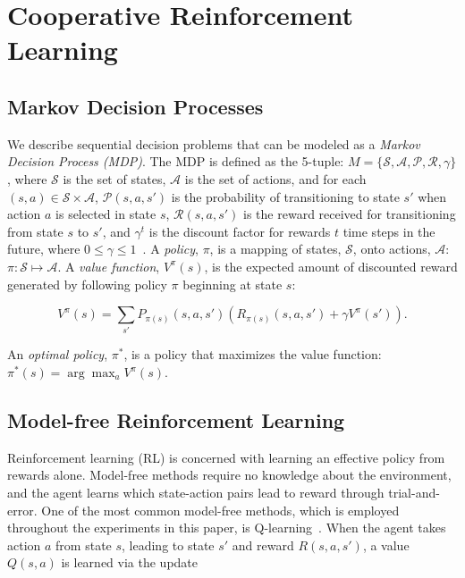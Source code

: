 \documentclass[letterpaper]{article}
\begin{document}
\section{Cooperative Reinforcement Learning}

\subsection{Markov Decision Processes}

We describe sequential decision problems that can be modeled as a \textit{Markov Decision Process (MDP)}. The MDP is defined as the 5-tuple: $M=\{\mathcal{S},\mathcal{A},\mathcal{P},\mathcal{R},\gamma\}$, where $\mathcal{S}$ is the set of states, $\mathcal{A}$ is the set of actions, and for each $(s,a) \in \mathcal{S} \times \mathcal{A}$, $\mathcal{P}(s,a,s')$ is the probability of transitioning to state $s'$ when action $a$ is selected in state $s$, $\mathcal{R}(s,a,s')$ is the reward received for transitioning from state $s$ to $s'$, and $\gamma^t$ is the discount factor for rewards $t$ time steps in the future, where $0\leq\gamma\leq1$~\cite{sutton1998reinforcement}. A \textit{policy}, $\pi$, is a mapping of states, $\mathcal{S}$, onto actions, $\mathcal{A}$: $\pi:\mathcal{S}\mapsto\mathcal{A}$. A \textit{value function}, $V^{\pi}(s)$, is the expected amount of discounted reward generated by following policy $\pi$ beginning at state $s$:

\begin{small}
\begin{equation} 
V^{\pi}(s) = \sum\limits_{s'} P_{\pi(s)}(s,a,s')(R_{\pi(s)}(s,a,s')+\gamma V^{\pi}(s')).
\end{equation}
\end{small}

\noindent
An \textit{optimal policy}, $\pi^{*}$, is a policy that maximizes the value function: $\pi^{*}(s) = \arg\max_a V^{\pi}(s)$.

\subsection{Model-free Reinforcement Learning}

Reinforcement learning (RL) is concerned with learning an effective policy from rewards alone. Model-free methods require no knowledge about the environment, and the agent learns which state-action pairs lead to reward through trial-and-error. One of the most common model-free methods, which is employed throughout the experiments in this paper, is Q-learning~\cite{sutton1998reinforcement}. When the agent takes action $a$ from state $s$, leading to state $s'$ and reward $R(s,a,s')$, a value $Q(s,a)$ is learned via the update
\end{document}
